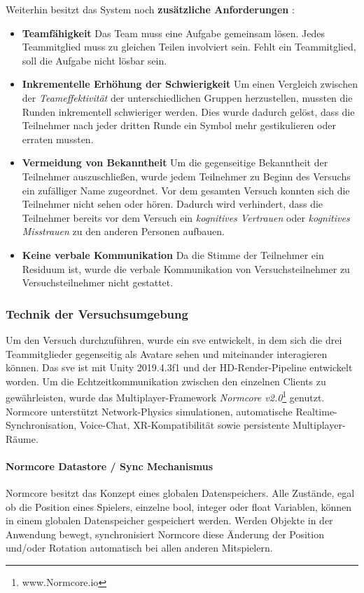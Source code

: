 \documentclass[a4paper,11pt]{article}%
\renewcommand{\\}{\vspace*{0.5\baselineskip} \newline}
\begin{document}
Weiterhin besitzt das System noch \textbf{zusätzliche Anforderungen} :

\begin{itemize}
\item \textbf{Teamfähigkeit} Das Team muss eine Aufgabe gemeinsam lösen. Jedes Teammitglied muss zu gleichen Teilen involviert sein. Fehlt ein Teammitglied, soll die Aufgabe nicht lösbar sein.
\item \textbf{Inkrementelle Erhöhung der Schwierigkeit} Um einen Vergleich zwischen der \textit{Teameffektivität} der unterschiedlichen Gruppen herzustellen, mussten die Runden inkrementell schwieriger werden. Dies wurde dadurch gelöst, dass die Teilnehmer nach jeder dritten Runde ein Symbol mehr gestikulieren oder erraten mussten.
\item \textbf{Vermeidung von Bekanntheit} Um die gegenseitige Bekanntheit der Teilnehmer auszuschließen, wurde jedem Teilnehmer zu Beginn des Versuchs ein zufälliger Name zugeordnet. Vor dem gesamten Versuch konnten sich die Teilnehmer nicht sehen oder hören.
Dadurch wird verhindert, dass die Teilnehmer bereits vor dem Versuch ein \textit{kognitives Vertrauen} oder \textit{kognitives Misstrauen} zu den anderen Personen aufbauen.
\item \textbf{Keine verbale Kommunikation} Da die Stimme der Teilnehmer ein Residuum ist, wurde die verbale Kommunikation von Versuchsteilnehmer zu Versuchsteilnehmer nicht gestattet. 
\end{itemize}

\subsubsection{Technik der Versuchsumgebung}
Um den Versuch durchzuführen, wurde ein \ac{sve} entwickelt, in dem sich die drei Teammitglieder gegenseitig als Avatare sehen und miteinander interagieren können. Das \ac{sve} ist mit Unity 2019.4.3f1 und der HD-Render-Pipeline entwickelt worden. Um die Echtzeitkommunikation zwischen den einzelnen Clients zu gewährleisten, wurde das Multiplayer-Framework \textit{Normcore v2.0}\footnote{www.Normcore.io} genutzt.
Normcore unterstützt Network-Physics simulationen, automatische Realtime- Synchronisation, Voice-Chat, XR-Kompatibilität sowie persistente Multiplayer-Räume.	

\paragraph{Normcore Datastore / Sync Mechanismus}
Normcore besitzt das Konzept eines globalen Datenspeichers. Alle Zustände, egal ob die Position eines Spielers, einzelne bool, integer oder float Variablen, können in einem globalen Datenspeicher gespeichert werden. Werden Objekte in der Anwendung bewegt, synchronisiert Normcore diese Änderung der Position und/oder Rotation automatisch bei allen anderen Mitspielern.
\end{document}
